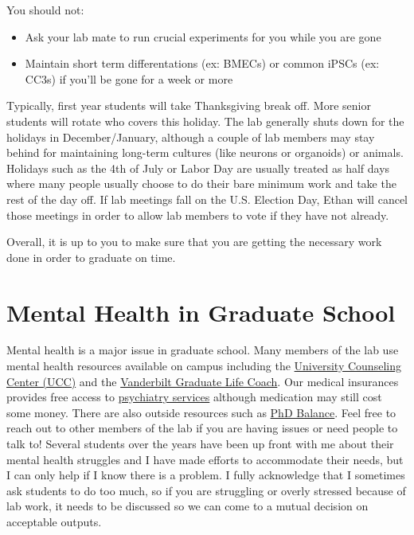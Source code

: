 \documentclass[
]{book}
\begin{document}
You should not:

\begin{itemize}
\item
  Ask your lab mate to run crucial experiments for you while you are gone
\item
  Maintain short term differentations (ex: BMECs) or common iPSCs (ex: CC3s) if you'll be gone for a week or more
\end{itemize}

Typically, first year students will take Thanksgiving break off. More senior students will rotate who covers this holiday. The lab generally shuts down for the holidays in December/January, although a couple of lab members may stay behind for maintaining long-term cultures (like neurons or organoids) or animals. Holidays such as the 4th of July or Labor Day are usually treated as half days where many people usually choose to do their bare minimum work and take the rest of the day off. If lab meetings fall on the U.S. Election Day, Ethan will cancel those meetings in order to allow lab members to vote if they have not already.

Overall, it is up to you to make sure that you are getting the necessary work done in order to graduate on time.

\hypertarget{mental-health-in-graduate-school}{%
\section{Mental Health in Graduate School}\label{mental-health-in-graduate-school}}

Mental health is a major issue in graduate school. Many members of the lab use mental health resources available on campus including the \href{https://www.vanderbilt.edu/ucc/}{University Counseling Center (UCC)} and the \href{https://gradschool.vanderbilt.edu/current_students/gradlife.php}{Vanderbilt Graduate Life Coach}. Our medical insurances provides free access to \href{https://www.vanderbilt.edu/ucc/services/psychiatric-services/}{psychiatry services} although medication may still cost some money. There are also outside resources such as \href{https://www.phdbalance.com/}{PhD Balance}. Feel free to reach out to other members of the lab if you are having issues or need people to talk to! Several students over the years have been up front with me about their mental health struggles and I have made efforts to accommodate their needs, but I can only help if I know there is a problem. I fully acknowledge that I sometimes ask students to do too much, so if you are struggling or overly stressed because of lab work, it needs to be discussed so we can come to a mutual decision on acceptable outputs.
\end{document}
